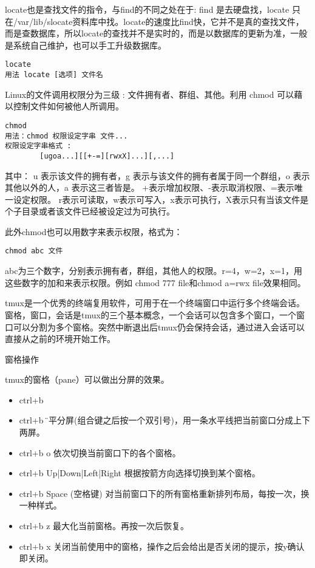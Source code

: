  locate也是查找文件的指令，与find的不同之处在于: find 是去硬盘找，locate 只在/var/lib/slocate资料库中找。locate的速度比find快，它并不是真的查找文件，而是查数据库，所以locate的查找并不是实时的，而是以数据库的更新为准，一般是系统自己维护，也可以手工升级数据库。
\begin{verbatim}
locate
用法 locate [选项] 文件名
\end{verbatim}

  Linux的文件调用权限分为三级 : 文件拥有者、群组、其他。利用 chmod 可以藉以控制文件如何被他人所调用。
\begin{verbatim}
chmod
用法：chmod 权限设定字串 文件...
权限设定字串格式 :
        [ugoa...][[+-=][rwxX]...][,...]
\end{verbatim}

其中：
u 表示该文件的拥有者，g 表示与该文件的拥有者属于同一个群组，o 表示其他以外的人，a 表示这三者皆是。
+表示增加权限、-表示取消权限、=表示唯一设定权限。
r表示可读取，w表示可写入，x表示可执行，X表示只有当该文件是个子目录或者该文件已经被设定过为可执行。

此外chmod也可以用数字来表示权限，格式为：
\begin{verbatim}
chmod abc 文件
\end{verbatim}
abc为三个数字，分别表示拥有者，群组，其他人的权限。r=4，w=2，x=1，用这些数字的加和来表示权限。例如
chmod 777 file和chmod a=rwx file效果相同。

tmux是一个优秀的终端复用软件，可用于在一个终端窗口中运行多个终端会话。窗格，窗口，会话是tmux的三个基本概念，一个会话可以包含多个窗口，一个窗口可以分割为多个窗格。突然中断退出后tmux仍会保持会话，通过进入会话可以直接从之前的环境开始工作。

窗格操作

tmux的窗格（pane）可以做出分屏的效果。
\begin{itemize}
\item ctrl+b %
\item ctrl+b \" 水平分屏(组合键之后按一个双引号)，用一条水平线把当前窗口分成上下两屏。
\item ctrl+b o 依次切换当前窗口下的各个窗格。
\item ctrl+b Up|Down|Left|Right 根据按箭方向选择切换到某个窗格。
\item ctrl+b Space (空格键) 对当前窗口下的所有窗格重新排列布局，每按一次，换一种样式。
\item ctrl+b z 最大化当前窗格。再按一次后恢复。
\item ctrl+b x 关闭当前使用中的窗格，操作之后会给出是否关闭的提示，按y确认即关闭。
\end{itemize}


